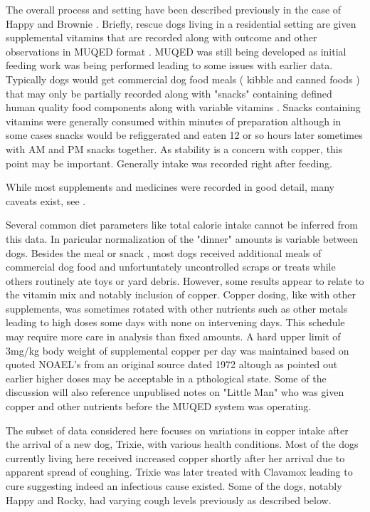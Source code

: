 \mjmdogsone

The overall process and setting  have been described previously
in the case of Happy
\cite{marchywka-MJM-2022-009-0.50rg}
\cite{mmarchywka-MJM-2019-001-.1li}
 and Brownie
\cite{mmarchywka-MJM-2021-003-v0.50rg}.
Briefly, rescue dogs living in a residential setting
are given supplemental vitamins that are recorded along
with outcome and other observations in MUQED format 
\cite{mmarchywka-MJM-2020-004-.012rg}.
MUQED was still being developed as initial feeding work 
was being performed leading to some issues with earlier data.
Typically dogs would get commercial dog food meals 
( kibble and canned foods ) 
that may only be partially recorded along with "snacks"
containing defined human quality food components along with variable
 vitamins \cite{marchywka-MJM-2021-018-0.50rg}.
Snacks containing vitamins were generally consumed within minutes
of preparation although in some cases snacks would be refiggerated
and eaten 12 or so hours later sometimes with AM and PM snacks together.
As stability is a concern with copper, this point may be important.
Generally intake was recorded right after feeding.



While most supplements and medicines were recorded 
in good detail,  many caveats exist, see .

Several common diet parameters like total calorie intake cannot be inferred
from this data.
In paricular normalization of the "dinner" amounts is variable
between dogs.
Besides the meal or snack ,
most dogs received additional meals of commercial dog food
and unfortuntately uncontrolled scraps or treats while others
routinely ate toys or yard debris. However, some 
results appear to relate to the vitamin mix and notably
inclusion of  copper. 
Copper dosing, like with other supplements,  was sometimes rotated 
with other nutrients such as other metals
leading to high doses some days with none on intervening days. 
This schedule may require more care in analysis than fixed amounts.
A hard upper limit of
3mg/kg body weight of supplemental copper per day was maintained  based 
on quoted NOAEL's from an  original source dated  1972 \cite{NAP9782}
altough as pointed out earlier higher doses may be acceptable in 
a pthological state. 
Some of the discussion will also reference unpublised notes
on "Little Man" who was given copper and other 
nutrients before the MUQED system was operating.


The subset of data considered here focuses on variations in copper
intake after the arrival of a new dog, Trixie, with various health
conditions.  
Most of the dogs currently living here received increased copper
shortly after her arrival due to apparent
spread of coughing. Trixie was later treated with Clavamox
leading to cure suggesting indeed an infectious cause existed. 
Some of the dogs, notably Happy and Rocky, had varying cough levels
previously as described below.  

